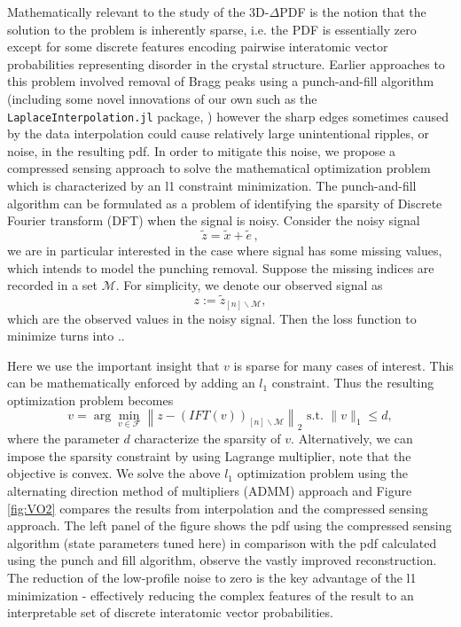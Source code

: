 Mathematically relevant to the study of the 3D-$\Delta$PDF is the notion that the
solution to the problem is inherently sparse, i.e. the PDF is essentially zero except
for some discrete features encoding pairwise interatomic vector probabilities
representing disorder in the crystal structure. Earlier approaches to this problem
involved removal of Bragg peaks using a punch-and-fill algorithm (including some
novel innovations of our own such as the \texttt{LaplaceInterpolation.jl} package, \cite{RH2022}) however the sharp edges
sometimes caused by the data interpolation could cause relatively large unintentional
ripples, or noise, in the resulting pdf. In order to mitigate this noise, we propose
a compressed sensing approach to solve the mathematical optimization problem which is characterized by an l1
constraint minimization. The punch-and-fill algorithm can be formulated as a problem of identifying the sparsity of Discrete Fourier transform (DFT) when the signal is noisy. Consider the noisy signal
\begin{equation}
    \widetilde{z} = \widetilde{x} + \widetilde{e}\,,
\end{equation}
we are in particular interested in the case where signal has some missing values, which intends to model the punching removal. Suppose the missing indices are recorded in a set $\mathcal{M}$. For simplicity, we denote our observed signal as
\begin{equation}
    z:=\widetilde{z}_{[n]\backslash\mathcal{M}},
\end{equation}
which are the observed values in the noisy signal. Then the loss function to minimize turns into $.$. 

Here we use the important insight that $v$ is sparse for many cases of interest. This can be mathematically enforced by adding an  $l_1$ constraint. Thus the resulting optimization problem becomes
\begin{equation}\label{eqn:complexopt}
    v = \arg\min_{v\in\mathcal{F}}\left\|z - \left(IFT(v)\right)_{[n]\backslash\mathcal{M}}\right\|_2 \text{ s.t. }\|v\|_1 \leq d,
\end{equation}
where the parameter $d$ characterize the sparsity of $v$. Alternatively, we can impose the sparsity constraint by using Lagrange multiplier, note that the objective is convex. We solve the above $l_1$ optimization problem using the alternating direction method of multipliers (ADMM)  approach and Figure \ref{fig:VO2} compares the results from interpolation and the compressed sensing approach. The left panel of the figure shows
the pdf using the compressed sensing algorithm (state parameters tuned here) in
comparison with the pdf calculated using the punch and fill algorithm, observe the vastly improved reconstruction. The reduction
of the low-profile noise to zero is the key advantage of the l1 minimization -
effectively reducing the complex features of the result to an interpretable set of
discrete interatomic vector probabilities. 

